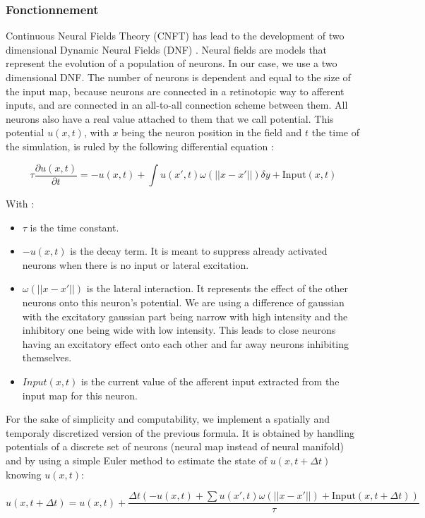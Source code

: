 	\subsubsection{Fonctionnement}

	Continuous Neural Fields Theory (CNFT) has lead to the development of two dimensional Dynamic Neural Fields (DNF) \cite{Taylor2D}. Neural fields are models that represent the evolution of a population of neurons. In our case, we use a two dimensional DNF. The number of neurons is dependent and equal to the size of the input map, because neurons are connected in a retinotopic way to afferent inputs, and are connected in an all-to-all connection scheme between them. All neurons also have a real value attached to them that we call potential. This potential $u(x,t)$, with $x$ being the neuron position in the field and $t$ the time of the simulation, is ruled by the following differential equation :

$$\tau \frac{\partial u(x, t)}{\partial t} = -u(x,t)+\int u(x',t)\omega(||x-x'||)\delta y + \text{Input}(x,t)$$

With :
\begin{itemize}
    \item $\tau$ is the time constant.
    \item $-u(x,t)$ is the decay term. It is meant to suppress already activated neurons when there is no input or lateral excitation.
    \item $\omega(||x-x'||)$ is the lateral interaction. It represents the effect of the other neurons onto this neuron's potential. We are using a difference of gaussian with the excitatory gaussian part being narrow with high intensity and the inhibitory one being wide with low intensity. This leads to close neurons having an excitatory effect onto each other and far away neurons inhibiting themselves.
    \item $Input(x,t)$ is the current value of the afferent input extracted from the input map for this neuron.
\end{itemize}

For the sake of simplicity and computability, we implement a spatially and temporaly discretized version of the previous formula. It is obtained by handling potentials of a discrete set of neurons (neural map instead of neural manifold) and by using a simple Euler method to estimate the state of $u(x,t+\Delta t)$ knowing $u(x,t)$:

$$u(x, t+\Delta t) = u(x, t) +\frac{\Delta t\left(-u(x, t)+\sum u(x', t)\omega(||x-x'||) + \text{Input}(x, t+\Delta t)\right)}{\tau}$$

